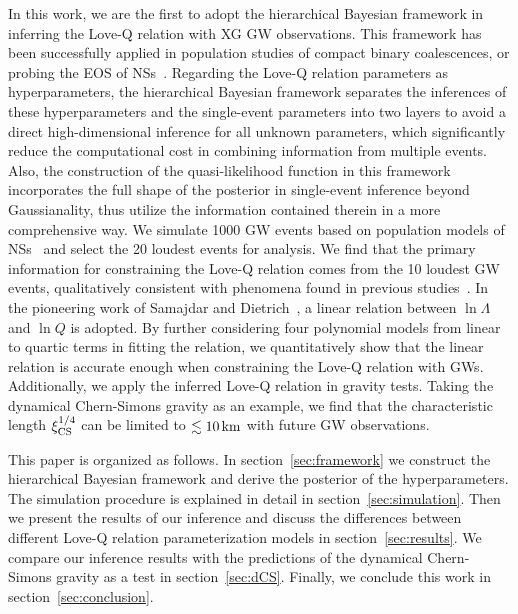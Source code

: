 \documentclass[a4paper,11pt]{article}
\begin{document}
In this work, we are the first to adopt the hierarchical Bayesian framework in inferring the Love-Q relation with XG GW observations.
This framework has been successfully applied in 
population studies of compact binary coalescences, or probing the EOS of NSs~\cite{Mandel:2009nx,Mandel:2009pc,Adams:2012qw,Lackey:2014fwa,Mandel:2018mve,Thrane_2019,KAGRA:2021duu,Wang:2024xon}. 
Regarding the Love-Q relation parameters as hyperparameters, the hierarchical 
Bayesian framework separates the inferences of these hyperparameters and the 
single-event parameters into two layers to avoid a direct high-dimensional inference
for all unknown parameters, which significantly reduce the computational cost
in combining information from multiple events.
 Also, the construction of the quasi-likelihood
function in this framework incorporates the full shape of the
posterior in single-event inference beyond Gaussianality, thus
utilize the information contained therein in a more comprehensive way.
We simulate 1000 GW events based on population models of
NSs~\cite{Fishbach:2018edt,Farrow:2019xnc,Samajdar:2020xrd} and select the 20
loudest events for analysis. We find that the primary information for
constraining the Love-Q relation comes from the 10 loudest GW events,
qualitatively consistent
with phenomena found in
previous studies~\cite{Lackey:2014fwa}. In the pioneering work of Samajdar and
Dietrich~\cite{Samajdar:2020xrd}, a linear relation between $\ln\Lambda$ and $\ln Q$
is adopted. By further considering four polynomial models
from linear to quartic terms in fitting the relation, we quantitatively show
 that
the linear relation is accurate enough when constraining the Love-Q relation
with GWs. Additionally, we apply the inferred Love-Q relation in gravity tests.
Taking the dynamical Chern-Simons gravity as an example, we find that the
characteristic length $\xi_{\rm CS}^{1/4}$ can be limited to $\lesssim 10\,{\rm km}$
with future GW observations. 

This paper is organized as follows. In section~\ref{sec:framework} we construct 
the hierarchical Bayesian framework and derive the posterior of the hyperparameters. 
The simulation procedure is explained in detail in section~\ref{sec:simulation}. 
Then we present the results of our inference and discuss the differences between different 
Love-Q relation parameterization models in section~\ref{sec:results}. 
We compare our inference results with the predictions of the dynamical Chern-Simons 
gravity as a test in section~\ref{sec:dCS}. Finally, we conclude this work in section~\ref{sec:conclusion}.
\end{document}
